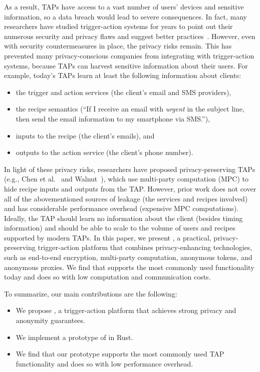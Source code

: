 As a result, TAPs have access to a vast number of users' devices and sensitive
information, so a data breach would lead to severe consequences. In fact, many
researchers have studied trigger-action systems for years to point out their
numerous security and privacy flaws and suggest better
practices~\cite{DBLP:conf/sp/ChenCWSCF21, DBLP:journals/corr/abs-2009-12447,
  DBLP:conf/imc/MiQZW17, DBLP:journals/corr/FernandesRJP17,
  DBLP:conf/www/SurbatovichABDJ17, DBLP:journals/access/XuZZCDG19}. However,
even with security countermeasures in place, the privacy risks remain. This has
prevented many privacy-conscious companies from integrating with trigger-action
systems, because TAPs can harvest sensitive information about their users.
For example, today's TAPs learn at least the following information about clients:
\begin{itemize}
  \item the trigger and action services (the client's email and SMS providers),
  \item the recipe semantics (``If I receive an email with \emph{urgent} in the
    subject line, then send the email information to my smartphone via SMS.''),
  \item inputs to the recipe (the client's emails), and
  \item outputs to the action service (the client's phone number).
\end{itemize}

In light of these privacy risks, researchers have proposed privacy-preserving
TAPs (e.g., Chen et al.~\cite{DBLP:conf/sp/ChenCWSCF21} and
Walnut~\cite{DBLP:journals/corr/abs-2009-12447}), which use multi-party
computation (MPC) to hide recipe inputs and outputs from the TAP. However, prior
work does not cover all of the abovementioned sources of leakage (the services
and recipes involved) and has considerable performance overhead (expensive MPC
computations). Ideally, the TAP should learn no information about the client
(besides timing information) and should be able to scale to the volume of users
and recipes supported by modern TAPs. In this paper, we present \sys, a
practical, privacy-preserving trigger-action platform that combines
privacy-enhancing technologies, such as end-to-end encryption, multi-party
computation, anonymous tokens, and anonymous proxies. We find that \sys supports
the most commonly used functionality today and does so with low computation and
communication costs.

To summarize, our main contributions are the following:
\begin{itemize}
  \item We propose \sys, a trigger-action platform that achieves strong privacy
    and anonymity guarantees.
  \item We implement a prototype of \sys in Rust.
  \item We find that our \sys prototype supports the most commonly used TAP
    functionality and does so with low performance overhead.
\end{itemize}

